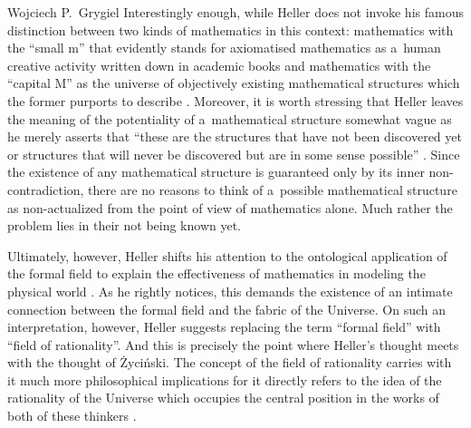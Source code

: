 \begin{artengenv}{Wojciech P.~Grygiel}
Interestingly enough, while Heller does not invoke his famous distinction between two kinds of mathematics in this context: mathematics with the ``small m'' that evidently stands for axiomatised mathematics as a~human creative activity written down in academic books and mathematics with the ``capital M'' as the universe of objectively existing mathematical structures which the former purports to describe
\parencite[e.g.][]{heller_co_2010}. %
 Moreover, it is worth stressing that Heller leaves the meaning of the potentiality of a~mathematical structure somewhat vague as he merely asserts that ``these are the structures that have not been discovered yet or structures that will never be discovered but are in some sense possible'' 
\parencite[][pp.236–237]{heller_uchwycic_1997}. %
 Since the existence of any mathematical structure is guaranteed only by its inner non-contradiction, there are no reasons to think of a~possible mathematical structure as non-actualized from the point of view of mathematics alone. Much rather the problem lies in their not being known yet.

Ultimately, however, Heller shifts his attention to the ontological application of the formal field to explain the effectiveness of mathematics in modeling the physical world
\parencite[][p.237]{heller_uchwycic_1997}. %
 As he rightly notices, this demands the existence of an intimate connection between the formal field and the fabric of the Universe. On such an interpretation, however, Heller suggests replacing the term ``formal field'' with ``field of rationality''. And this is precisely the point where Heller's thought meets with the thought of Życiński. The concept of the field of rationality carries with it much more philosophical implications for it directly refers to the idea of the rationality of the Universe which occupies the central position in the works of both of these thinkers 
\parencites[e.g.][]{heller_czy_2006}[][]{zycinski_granice_2013}.%



\end{artengenv}
